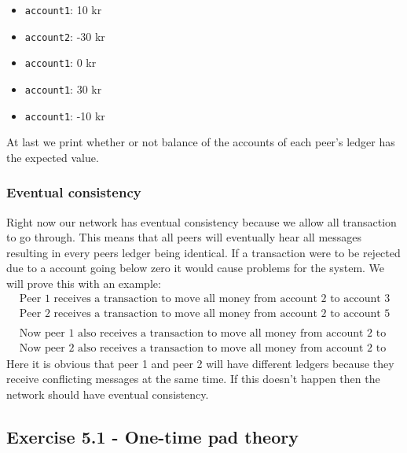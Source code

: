 \documentclass[
  paper=a4,
  ,captions=tableheading
]{scrartcl}
\newcommand{\passthrough}[1]{#1}
\providecommand{\tightlist}{%
  \setlength{\itemsep}{0pt}\setlength{\parskip}{0pt}}
\begin{document}
\begin{itemize}
\tightlist
\item
  \passthrough{\lstinline!account1!}: 10 kr
\item
  \passthrough{\lstinline!account2!}: -30 kr
\item
  \passthrough{\lstinline!account1!}: 0 kr
\item
  \passthrough{\lstinline!account1!}: 30 kr
\item
  \passthrough{\lstinline!account1!}: -10 kr
\end{itemize}

At last we print whether or not balance of the accounts of each peer's
ledger has the expected value.

\hypertarget{eventual-consistency}{%
\subsubsection{\texorpdfstring{\textbf{Eventual
consistency}}{Eventual consistency}}\label{eventual-consistency}}

Right now our network has eventual consistency because we allow all
transaction to go through. This means that all peers will eventually
hear all messages resulting in every peers ledger being identical. If a
transaction were to be rejected due to a account going below zero it
would cause problems for the system. We will prove this with an example:
\[\begin{aligned}
    &\text{Peer 1 receives a transaction to move all money from account 2 to account 3 and performs the request}\\
    &\text{Peer 2 receives a transaction to move all money from account 2 to account 5 and performs the request}\\
    &\text{}\\
    &\text{Now peer 1 also receives a transaction to move all money from account 2 to account 5 which is rejected}\\
    &\text{Now peer 2 also receives a transaction to move all money from account 2 to account 3 which is rejected}
\end{aligned}\] Here it is obvious that peer 1 and peer 2 will have
different ledgers because they receive conflicting messages at the same
time. If this doesn't happen then the network should have eventual
consistency.

\hypertarget{exercise-5.1---one-time-pad-theory}{%
\subsection{Exercise 5.1 - One-time pad
theory}\label{exercise-5.1---one-time-pad-theory}}
\end{document}

